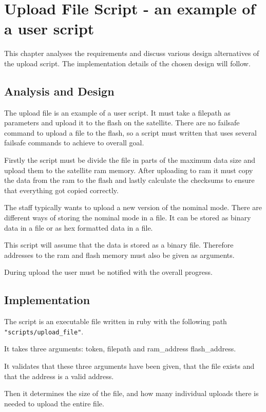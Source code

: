 \chapter{Upload File Script - an example of a user script}
\label{chap:upload_script}
This chapter analyses the requirements and discuss various design alternatives of the upload script. The implementation details of the chosen design will follow.

\section{Analysis and Design}

The upload file is an example of a user script. It must take a filepath as parameters and upload it to the flash on the satellite. There are no failsafe command to upload a file to the flash, so a script must written that uses several failsafe commands to achieve to overall goal.

Firstly the script must be divide the file in parts of the maximum data size and upload them to the satellite ram memory. After uploading to ram it must copy the data from the ram to the flash and lastly calculate the checksums to ensure that everything got copied correctly.

The staff typically wants to upload a new version of the nominal mode. There are different ways of storing the nominal mode in a file. It can be stored as binary data in a file or as hex formatted data in a file.

This script will assume that the data is stored as a binary file. Therefore addresses to the ram and flash memory must also be given as arguments.

During upload the user must be notified with the overall progress.

\section{Implementation}
The script is an executable file written in ruby with the following path \texttt{"scripts/upload\_file"}.

It takes three arguments: token, filepath and ram\_address flash\_address.

It validates that these three arguments have been given, that the file exists and that the address is a valid address.

Then it determines the size of the file, and how many individual uploads there is needed to upload the entire file.

